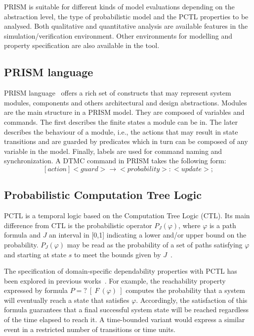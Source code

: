PRISM is suitable for different kinds of model evaluations depending on the abstraction level, the type of probabilistic model and the PCTL properties to be analysed. Both qualitative and quantitative analysis are available features in the simulation/verification environment. Other environments for modelling and property specification are also available in the tool.
  
\subsection{PRISM language}

PRISM language~\cite{PRISM:language} offers a rich set of constructs that may represent system modules, components and others architectural and design abstractions. Modules are the main structure in a PRISM model. They are composed of variables and commands. The first describes the finite states a module can be in. The later describes the behaviour of a module, i.e., the actions that may result in state transitions and are guarded by predicates which in turn can be composed of any variable in the model. Finally, labels are used for command naming and synchronization. A DTMC command in PRISM takes the following form: $$[action]<guard>\to<probability>:<update>;$$

\subsection{Probabilistic Computation Tree Logic}

PCTL is a temporal logic based on the Computation Tree Logic (CTL). Its main difference from CTL is the probabilistic operator $ P_J(\varphi)$, where $\varphi$ is a path formula and $J$ an interval in [0,1] indicating a lower and/or upper bound on the probability. $ P_J(\varphi)$ may be read as the probability of a set of paths satisfying $\varphi$ and starting at state $s$ to meet the bounds given by $J$~\cite{Baier:2008}.


The specification of domain-specific dependability properties with PCTL has been explored in previous works~\cite{Kwiatkowska:2009, Nunes:2012, Kwiatkowska:2012}. For example, the reachability property expressed by formula $P=?\ [\ F\ (\varphi)\ ] $ computes the probability that a system will eventually reach a state that satisfies $ \varphi $. Accordingly, the satisfaction of this formula guarantees that a final successful system state will be reached regardless of the time elapsed to reach it. A time-bounded variant would express a similar event in a restricted number of transitions or time units. 

